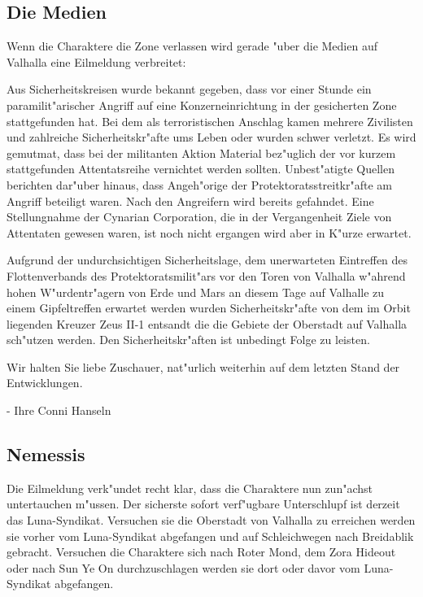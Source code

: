 
\subsection{Die Medien} 
Wenn die Charaktere die Zone verlassen wird gerade "uber die Medien auf Valhalla eine Eilmeldung verbreitet:

\begin{speech}
Aus Sicherheitskreisen wurde bekannt gegeben, dass vor einer Stunde ein paramilit"arischer Angriff auf eine Konzerneinrichtung in der gesicherten Zone stattgefunden hat. Bei dem als terroristischen Anschlag kamen mehrere Zivilisten und zahlreiche Sicherheitskr"afte ums Leben oder wurden schwer verletzt. Es wird gemutma\3t, dass bei der militanten Aktion Material bez"uglich der vor kurzem stattgefunden Attentatsreihe vernichtet werden sollten. Unbest"atigte Quellen berichten dar"uber hinaus, dass Angeh"orige der Protektoratsstreitkr"afte am Angriff beteiligt waren. Nach den Angreifern wird bereits gefahndet. Eine Stellungnahme der Cynarian Corporation, die in der Vergangenheit Ziele von Attentaten gewesen waren, ist noch nicht ergangen wird aber in K"urze erwartet.

Aufgrund der undurchsichtigen Sicherheitslage, dem unerwarteten Eintreffen des Flottenverbands des Protektoratsmilit"ars vor den Toren von Valhalla w"ahrend hohen W"urdentr"agern von Erde und Mars an diesem Tage auf Valhalle zu einem Gipfeltreffen erwartet werden wurden Sicherheitskr"afte von dem im Orbit liegenden Kreuzer Zeus II-1 entsandt die die Gebiete der Oberstadt auf Valhalla sch"utzen werden. Den Sicherheitskr"aften ist unbedingt Folge zu leisten.

Wir halten Sie liebe Zuschauer, nat"urlich weiterhin auf dem letzten Stand der Entwicklungen.

\nopagebreak
- Ihre Conni Hanseln
\end{speech}

\subsection{Nemessis} 
Die Eilmeldung verk"undet recht klar, dass die Charaktere nun zun"achst untertauchen m"ussen. Der sicherste sofort verf"ugbare Unterschlupf ist derzeit das Luna-Syndikat. Versuchen sie die Oberstadt von Valhalla zu erreichen werden sie vorher vom Luna-Syndikat abgefangen und auf Schleichwegen nach Breidablik gebracht. Versuchen die Charaktere sich nach Roter Mond, dem Zora Hideout oder nach Sun Ye On durchzuschlagen werden sie dort oder davor vom Luna-Syndikat abgefangen.


